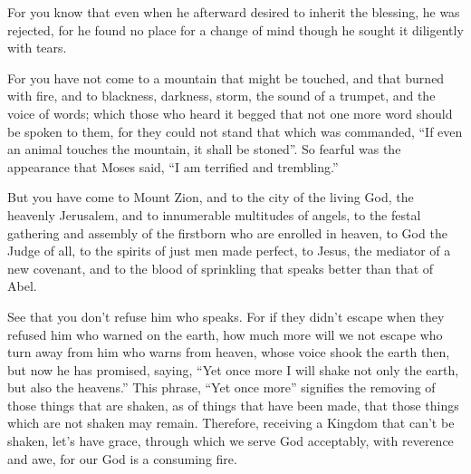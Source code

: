 {For you know that even when he afterward desired to inherit the blessing, he was rejected, for he found no place for a change of mind though he sought it diligently with tears.
\par }{\PP {}For you have not come to a mountain that might be touched, and that burned with fire, and to blackness, darkness, storm,
the sound of a trumpet, and the voice of words; which those who heard it begged that not one more word should be spoken to them,
for they could not stand that which was commanded, “If even an animal touches the mountain, it shall be stoned”.
So fearful was the appearance that Moses said, “I am terrified and trembling.”
\par }{\PP {}But you have come to Mount Zion, and to the city of the living God, the heavenly Jerusalem, and to innumerable multitudes of angels,
to the festal gathering and assembly of the firstborn who are enrolled in heaven, to God the Judge of all, to the spirits of just men made perfect,
to Jesus, the mediator of a new covenant, and to the blood of sprinkling that speaks better than that of Abel.
\par }{\PP {}See that you don’t refuse him who speaks. For if they didn’t escape when they refused him who warned on the earth, how much more will we not escape who turn away from him who warns from heaven,
whose voice shook the earth then, but now he has promised, saying, “Yet once more I will shake not only the earth, but also the heavens.”
This phrase, “Yet once more” signifies the removing of those things that are shaken, as of things that have been made, that those things which are not shaken may remain.
Therefore, receiving a Kingdom that can’t be shaken, let’s have grace, through which we serve God acceptably, with reverence and awe,
for our God is a consuming fire.

}
